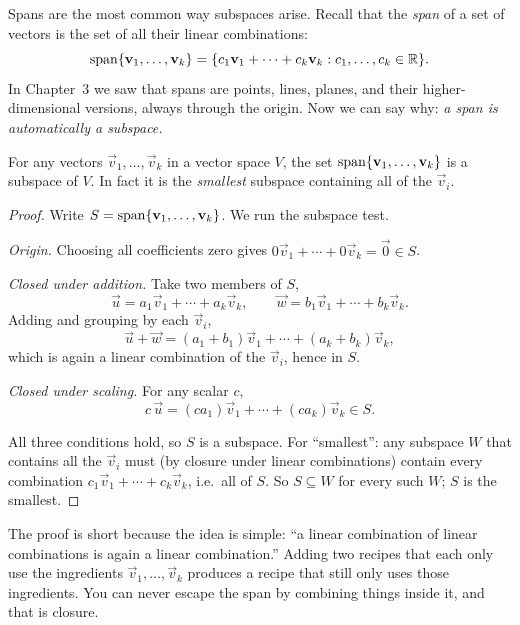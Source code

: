 Spans are the most common way subspaces arise. Recall that the
\emph{span} of a set of vectors is the set of all their linear combinations:
\[
\operatorname{span}\{\mathbf{v}_1,\dots,\mathbf{v}_k\} = \{ c_1\mathbf{v}_1 + \cdots + c_k\mathbf{v}_k : c_1,\dots,c_k\in\mathbb{R} \}.
\]
In Chapter~3 we saw that spans are points, lines, planes, and their higher-dimensional
versions, always through the origin. Now we can say why: \emph{a span is automatically a
subspace.}

\begin{theorem}\label{ch11:span-is-subspace}
For any vectors $\vec{v}_1,\dots,\vec{v}_k$ in a vector space $V$, the set
$\operatorname{span}\{\mathbf{v}_1,\dots,\mathbf{v}_k\}$ is a subspace of $V$. In fact it is the
\emph{smallest} subspace containing all of the $\vec{v}_i$.
\end{theorem}

\begin{proof}
Write $S = \operatorname{span}\{\mathbf{v}_1,\dots,\mathbf{v}_k\}$. We run the subspace test.

\emph{Origin.} Choosing all coefficients zero gives
$0\vec{v}_1 + \cdots + 0\vec{v}_k = \vec{0}\in S$.

\emph{Closed under addition.} Take two members of $S$,
\[
\vec{u} = a_1\vec{v}_1 + \cdots + a_k\vec{v}_k, \qquad
\vec{w} = b_1\vec{v}_1 + \cdots + b_k\vec{v}_k.
\]
Adding and grouping by each $\vec{v}_i$,
\[
\vec{u} + \vec{w} = (a_1+b_1)\vec{v}_1 + \cdots + (a_k+b_k)\vec{v}_k,
\]
which is again a linear combination of the $\vec{v}_i$, hence in $S$.

\emph{Closed under scaling.} For any scalar $c$,
\[
c\,\vec{u} = (ca_1)\vec{v}_1 + \cdots + (ca_k)\vec{v}_k \in S.
\]

All three conditions hold, so $S$ is a subspace. For ``smallest'': any subspace $W$ that
contains all the $\vec{v}_i$ must (by closure under linear combinations) contain every
combination $c_1\vec{v}_1+\cdots+c_k\vec{v}_k$, i.e.\ all of $S$. So $S\subseteq W$ for every
such $W$; $S$ is the smallest.
\end{proof}

\begin{intuitionbox}
The proof is short because the idea is simple: ``a linear combination of linear
combinations is again a linear combination.'' Adding two recipes that each only use the
ingredients $\vec{v}_1,\dots,\vec{v}_k$ produces a recipe that still only uses those
ingredients. You can never escape the span by combining things inside it, and that is
closure.
\end{intuitionbox}

